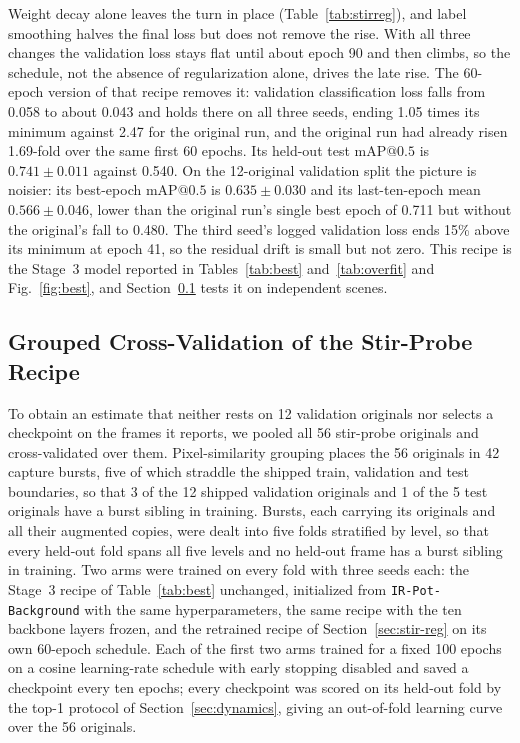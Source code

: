 ﻿\documentclass[journal]{IEEEtran}
\begin{document}
Weight decay alone leaves the turn in place (Table~\ref{tab:stirreg}), and label smoothing halves the final loss but does not remove the rise. With all three changes the validation loss stays flat until about epoch 90 and then climbs, so the schedule, not the absence of regularization alone, drives the late rise. The 60-epoch version of that recipe removes it: validation classification loss falls from 0.058 to about 0.043 and holds there on all three seeds, ending 1.05 times its minimum against 2.47 for the original run, and the original run had already risen 1.69-fold over the same first 60 epochs. Its held-out test $\text{mAP@0.5}$ is $0.741 \pm 0.011$ against 0.540. On the 12-original validation split the picture is noisier: its best-epoch $\text{mAP@0.5}$ is $0.635 \pm 0.030$ and its last-ten-epoch mean $0.566 \pm 0.046$, lower than the original run's single best epoch of 0.711 but without the original's fall to 0.480. The third seed's logged validation loss ends 15\% above its minimum at epoch 41, so the residual drift is small but not zero. This recipe is the Stage~3 model reported in Tables~\ref{tab:best} and~\ref{tab:overfit} and Fig.~\ref{fig:best}, and Section~\ref{sec:stir-cv} tests it on independent scenes.

\subsection{Grouped Cross-Validation of the Stir-Probe Recipe}
\label{sec:stir-cv}
To obtain an estimate that neither rests on 12 validation originals nor selects a checkpoint on the frames it reports, we pooled all 56 stir-probe originals and cross-validated over them. Pixel-similarity grouping places the 56 originals in 42 capture bursts, five of which straddle the shipped train, validation and test boundaries, so that 3 of the 12 shipped validation originals and 1 of the 5 test originals have a burst sibling in training. Bursts, each carrying its originals and all their augmented copies, were dealt into five folds stratified by level, so that every held-out fold spans all five levels and no held-out frame has a burst sibling in training. Two arms were trained on every fold with three seeds each: the Stage~3 recipe of Table~\ref{tab:best} unchanged, initialized from \texttt{IR-Pot-Background} with the same hyperparameters, the same recipe with the ten backbone layers frozen, and the retrained recipe of Section~\ref{sec:stir-reg} on its own 60-epoch schedule. Each of the first two arms trained for a fixed 100 epochs on a cosine learning-rate schedule with early stopping disabled and saved a checkpoint every ten epochs; every checkpoint was scored on its held-out fold by the top-1 protocol of Section~\ref{sec:dynamics}, giving an out-of-fold learning curve over the 56 originals.
\end{document}
